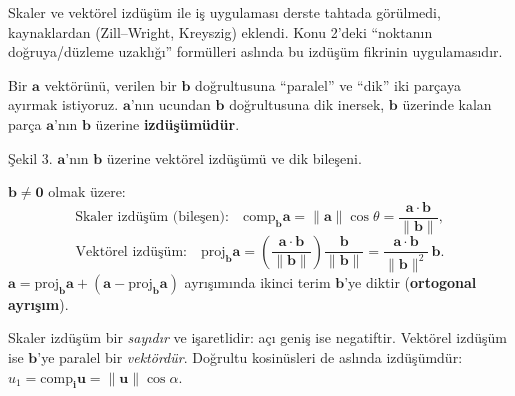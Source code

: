 \begin{bilgi}
Skaler ve vektörel izdüşüm ile iş uygulaması derste tahtada görülmedi, kaynaklardan (Zill--Wright, Kreyszig) eklendi. Konu 2'deki ``noktanın doğruya/düzleme uzaklığı'' formülleri aslında bu izdüşüm fikrinin uygulamasıdır.
\end{bilgi}

Bir $\mathbf a$ vektörünü, verilen bir $\mathbf b$ doğrultusuna ``paralel'' ve ``dik'' iki parçaya ayırmak istiyoruz. $\mathbf a$'nın ucundan $\mathbf b$ doğrultusuna dik inersek, $\mathbf b$ üzerinde kalan parça $\mathbf a$'nın $\mathbf b$ üzerine \textbf{izdüşümüdür}.

\begin{center}

{\small Şekil 3. $\mathbf a$'nın $\mathbf b$ üzerine vektörel izdüşümü ve dik bileşeni.}
\end{center}

\begin{teorem}
$\mathbf b\neq\mathbf 0$ olmak üzere:
\[
\text{Skaler izdüşüm (bileşen):}\quad \text{comp}_{\mathbf b}\mathbf a=\|\mathbf a\|\cos\theta=\frac{\mathbf a\cdot\mathbf b}{\|\mathbf b\|},
\]
\[
\text{Vektörel izdüşüm:}\quad \text{proj}_{\mathbf b}\mathbf a=\left(\frac{\mathbf a\cdot\mathbf b}{\|\mathbf b\|}\right)\frac{\mathbf b}{\|\mathbf b\|}=\frac{\mathbf a\cdot\mathbf b}{\|\mathbf b\|^2}\,\mathbf b .
\]
$\mathbf a=\text{proj}_{\mathbf b}\mathbf a+(\mathbf a-\text{proj}_{\mathbf b}\mathbf a)$ ayrışımında ikinci terim $\mathbf b$'ye diktir (\textbf{ortogonal ayrışım}).
\end{teorem}

Skaler izdüşüm bir \emph{sayıdır} ve işaretlidir: açı geniş ise negatiftir. Vektörel izdüşüm ise $\mathbf b$'ye paralel bir \emph{vektördür}. Doğrultu kosinüsleri de aslında izdüşümdür: $u_1=\text{comp}_{\mathbf i}\mathbf u=\|\mathbf u\|\cos\alpha$.

